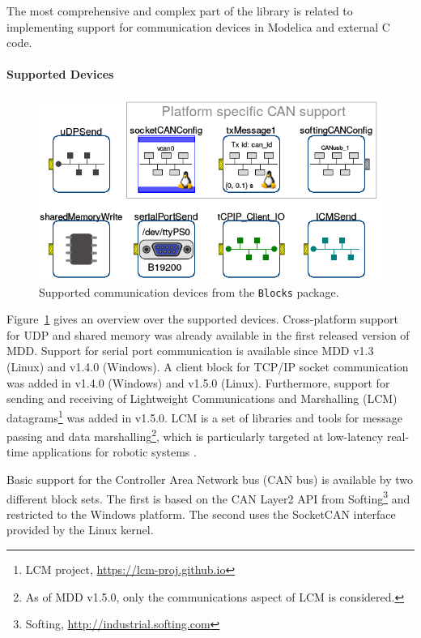 \documentclass{resources/modelica}
\newcommand{\modelica}[1]{\lstinline[language=modelica]|#1|}
\begin{document}
The most comprehensive and complex part of the library is related to
implementing support for communication devices in Modelica and external 
C code.

\paragraph{Supported Devices}

\begin{figure}[htb]
  \centering
  \includegraphics[width=0.9\columnwidth]{figures/OverviewCommunicationDevices}
  \caption{Supported communication devices from the \modelica{Blocks} package.}
  \label{fig:OverviewCommunicationDevices}
\end{figure}


Figure~\ref{fig:OverviewCommunicationDevices} gives an overview over the
supported devices. Cross-platform support for UDP and shared memory was already
available in the first released version of MDD. Support for serial port communication is
available since MDD v1.3 (Linux) and v1.4.0 (Windows). A client block for TCP/IP
socket communication was added in v1.4.0 (Windows) and v1.5.0 (Linux).
Furthermore, support for sending and receiving of Lightweight Communications and
Marshalling (LCM) datagrams\footnote{LCM project,
\url{https://lcm-proj.github.io}} was added in v1.5.0.
LCM is a set of libraries and tools for message passing and data marshalling\footnote{As of MDD
v1.5.0, only the communications aspect of LCM is considered.},
which is particularly targeted at low-latency real-time applications for
robotic systems \citep{Huang2010}.

Basic support for the Controller Area Network bus (CAN bus) is available by two
different block sets. The first is based on the CAN Layer2 API from
Softing\footnote{Softing, \url{http://industrial.softing.com}} and restricted to the
Windows platform. The second uses the SocketCAN
interface provided by the Linux kernel.
\end{document}
